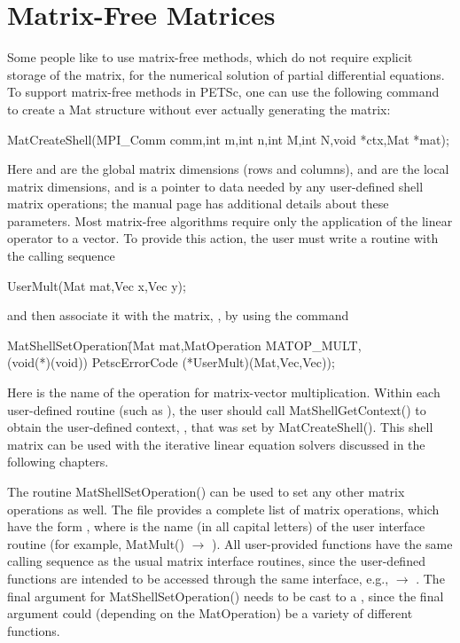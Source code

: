 \section{Matrix-Free Matrices} 
\label{sec_matrixfree}
Some people like to use matrix-free methods, which do not require
explicit storage of the matrix, for the numerical solution of partial
differential equations.  To support matrix-free methods in PETSc, one
can use the following command to create a Mat structure without
ever actually generating the matrix:
\begin{tabbing}
  MatCreateShell(MPI\_Comm comm,int m,int n,int M,int N,void *ctx,Mat *mat);
\end{tabbing}
Here  and  are the global matrix dimensions (rows and
columns),  and  are the local matrix dimensions, and
 is a pointer to data needed by any user-defined shell matrix
operations; the manual page has additional details about these
parameters.  Most matrix-free algorithms require only the application
of the linear operator to a vector. To provide this action, the user
must write a routine with the calling sequence
\begin{tabbing}
  UserMult(Mat mat,Vec x,Vec y);
\end{tabbing}
and then associate it with the matrix, , by using the 
command 
\begin{tabbing}
  MatShellSetOperation\=(Mat mat,MatOperation MATOP\_MULT,\\
                      \>         (void(*)(void)) PetscErrorCode (*UserMult)(Mat,Vec,Vec));
\end{tabbing}
Here  is the name of the operation for matrix-vector
multiplication. Within each user-defined routine (such as
), the user should call 
MatShellGetContext() to obtain the user-defined context, ,
that was set by MatCreateShell().
This shell matrix can be used with the iterative linear
equation solvers discussed in the following chapters.

The routine MatShellSetOperation() can be used to set any other
matrix operations as well.  The file 
 provides a complete list of matrix
operations, which have the form , where  is the name (in all capital letters) of the user
interface routine (for example, MatMult() $ \rightarrow $ ).  All
user-provided functions have the same calling sequence as the
usual matrix interface routines, since the user-defined functions are
intended to be accessed through the same interface, e.g., 
 $ \rightarrow$ .
The final argument for MatShellSetOperation() needs to be cast
to a , since the final argument could (depending on the 
MatOperation) be a variety of different functions.

